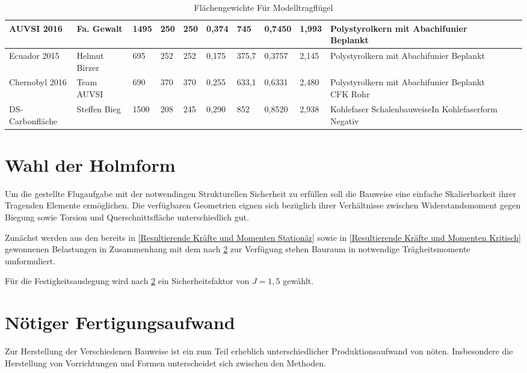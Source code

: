 \begin{table}
\begin{adjustbox}{angle=90}
\begin{tabular}{|l|l|l|l|l|l|l|l|l|l|l|l|}
AUVSI 2016                     & Fa. Gewalt         & 1495            & 250              & 250              & 0,374         & 745         & 0,7450       & 1,993                    & Polystyrolkern mit Abachifunier Beplankt                         \\\hline
Ecuador 2015                   & Helmut Birzer      & 695             & 252              & 252              & 0,175         & 375,7       & 0,3757       & 2,145                    & Polystyrolkern mit Abachifunier Beplankt                         \\\hline
Chernobyl 2016                 & Team AUVSI         & 690             & 370              & 370              & 0,255         & 633,1       & 0,6331       & 2,480                    & Polystyrolkern mit Abachifunier Beplankt CFK Rohr                \\\hline
DS-Carbonfläche               & Steffen Bieg       & 1500            & 208              & 245              & 0,290         & 852         & 0,8520       & 2,938                    & Kohlefaser SchalenbauweiseIn Kohlefaserform Negativ \\  \hline               
\end{tabular}
\end{adjustbox}
\caption{Flächengewichte Für Modelltragflügel}
\label{tab:Flächengewichte Für Modelltragflügel}
\end{table}

\section{Wahl der Holmform}

Um die gestellte Flugaufgabe mit der notwendingen Strukturellen Sicherheit zu erfüllen soll die Bauweise eine einfache Skalierbarkeit ihrer Tragenden Elemente ermöglichen.
Die verfügbaren Geometrien eignen sich bezüglich ihrer Verhältnisse zwischen Widerstandsmoment gegen Biegung sowie Torsion und Querschnittsfläche unterschiedlich gut.

Zunächst werden aus den bereits in \ref{Resultierende Kräfte und Momenten Stationär} sowie in \ref{Resultierende Kräfte und Momenten Kritisch} gewonnenen Belastungen in Zusammenhang mit dem nach \ref{} zur Verfügung stehen Bauraum in notwendige Trägheitsmomente umformuliert.

Für die Festigkeitsauslegung wird nach \ref{} ein Sicherheitsfaktor von $ J = 1,5 $ gewählt.

\section{Nötiger Fertigungsaufwand}

Zur Herstellung der Verschiedenen Bauweise ist ein zum Teil erheblich unterschiedlicher Produktionsaufwand von nöten. Insbesondere die Herstellung von Vorrichtungen und Formen unterscheidet sich zwischen den Methoden. 